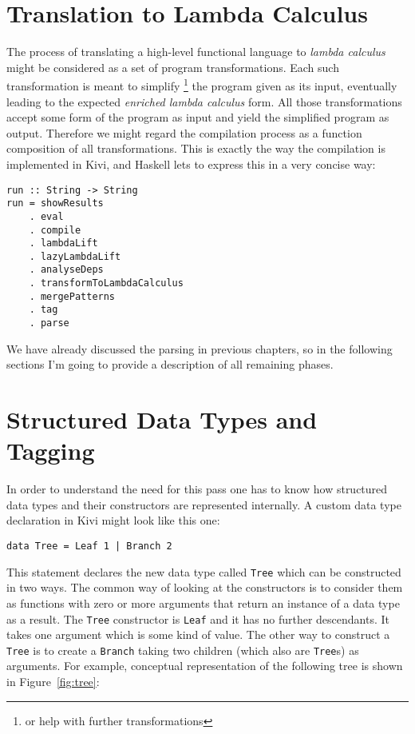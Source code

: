 \documentclass[a4paper]{report}
\begin{document}
\section{Translation to Lambda Calculus}
The process of translating a high-level functional language to \textit{lambda
calculus} might be considered as a set of program transformations. Each such
transformation is meant to simplify \footnote{or help with further
transformations} the program given as its input, eventually leading to the
expected \textit{enriched lambda calculus} form.
All those transformations accept some form of the program as input and yield
the simplified program as output. Therefore we might regard the compilation
process as a function composition of all transformations. This is exactly the
way the compilation is implemented in Kivi, and Haskell lets to express this
in a very concise way:

\begin{lstlisting}
run :: String -> String
run = showResults
    . eval
    . compile
    . lambdaLift
    . lazyLambdaLift
    . analyseDeps
    . transformToLambdaCalculus
    . mergePatterns
    . tag
    . parse
\end{lstlisting}

We have already discussed the parsing in previous chapters, so in the following
sections I'm going to provide a description of all remaining phases.

\section{Structured Data Types and Tagging}
In order to understand the need for this pass one has to know how structured
data types and their constructors are represented internally.
A custom data type declaration in Kivi might look like this one:

\begin{lstlisting}
data Tree = Leaf 1 | Branch 2
\end{lstlisting}

This statement declares the new data type called \texttt{Tree} which can be
constructed in two ways. The common way of looking at the constructors is to
consider them as functions with zero or more arguments that return an instance
of a data type as a result. The \texttt{Tree} constructor is \texttt{Leaf} and
it has no further descendants. It takes one argument which is some kind of
value. The other way to construct a \texttt{Tree} is to create a \texttt{Branch}
taking two children (which also are \texttt{Tree}s) as arguments. For example,
conceptual representation of the following tree is shown in Figure~\ref{fig:tree}:
\end{document}
